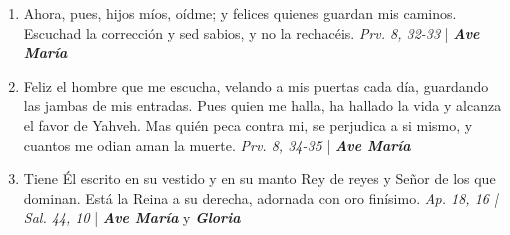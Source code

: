 \documentclass[../../devocionario.tex]{subfiles}
\begin{document}
\begin{enumerate}
        \item Ahora, pues, hijos míos, oídme; y felices quienes guardan mis caminos. 
            Escuchad la corrección y sed sabios, y no la rechacéis. \textit{Prv. 8, 32-33} | \textbf{\textit{Ave María}}

        \item Feliz el hombre que me escucha, velando a mis puertas cada día, guardando las 
            jambas de mis entradas. Pues quien me halla, ha hallado la vida y alcanza el favor 
            de Yahveh. Mas quién peca contra mi, se perjudica a si mismo, y cuantos me odian aman la muerte. 
            \textit{Prv. 8, 34-35} | \textbf{\textit{Ave María}}

        \item Tiene Él escrito en su vestido y en su manto Rey de reyes y Señor de los que dominan. 
            Está la Reina a su derecha, adornada con oro finísimo. \textit{Ap. 18, 16 | Sal. 44, 10} | \textbf{\textit{Ave María}} y \textbf{\textit{Gloria}}

    \end{enumerate}
\end{document}
